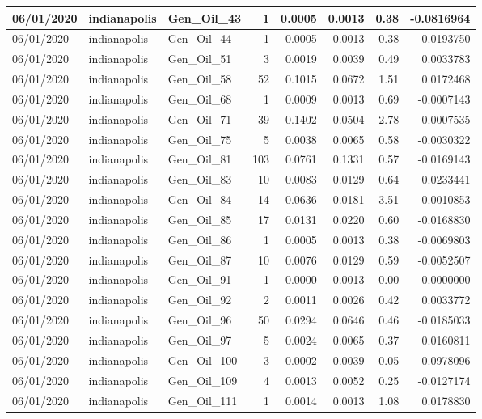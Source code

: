 \documentclass[
  letterpaper,
  DIV=11,
  numbers=noendperiod]{scrartcl}
\begin{document}
\begin{tabular}{l|l|l|r|r|r|r|r}
\hline
06/01/2020 & indianapolis & Gen\_Oil\_43 & 1 & 0.0005 & 0.0013 & 0.38 & -0.0816964\\
\hline
06/01/2020 & indianapolis & Gen\_Oil\_44 & 1 & 0.0005 & 0.0013 & 0.38 & -0.0193750\\
\hline
06/01/2020 & indianapolis & Gen\_Oil\_51 & 3 & 0.0019 & 0.0039 & 0.49 & 0.0033783\\
\hline
06/01/2020 & indianapolis & Gen\_Oil\_58 & 52 & 0.1015 & 0.0672 & 1.51 & 0.0172468\\
\hline
06/01/2020 & indianapolis & Gen\_Oil\_68 & 1 & 0.0009 & 0.0013 & 0.69 & -0.0007143\\
\hline
06/01/2020 & indianapolis & Gen\_Oil\_71 & 39 & 0.1402 & 0.0504 & 2.78 & 0.0007535\\
\hline
06/01/2020 & indianapolis & Gen\_Oil\_75 & 5 & 0.0038 & 0.0065 & 0.58 & -0.0030322\\
\hline
06/01/2020 & indianapolis & Gen\_Oil\_81 & 103 & 0.0761 & 0.1331 & 0.57 & -0.0169143\\
\hline
06/01/2020 & indianapolis & Gen\_Oil\_83 & 10 & 0.0083 & 0.0129 & 0.64 & 0.0233441\\
\hline
06/01/2020 & indianapolis & Gen\_Oil\_84 & 14 & 0.0636 & 0.0181 & 3.51 & -0.0010853\\
\hline
06/01/2020 & indianapolis & Gen\_Oil\_85 & 17 & 0.0131 & 0.0220 & 0.60 & -0.0168830\\
\hline
06/01/2020 & indianapolis & Gen\_Oil\_86 & 1 & 0.0005 & 0.0013 & 0.38 & -0.0069803\\
\hline
06/01/2020 & indianapolis & Gen\_Oil\_87 & 10 & 0.0076 & 0.0129 & 0.59 & -0.0052507\\
\hline
06/01/2020 & indianapolis & Gen\_Oil\_91 & 1 & 0.0000 & 0.0013 & 0.00 & 0.0000000\\
\hline
06/01/2020 & indianapolis & Gen\_Oil\_92 & 2 & 0.0011 & 0.0026 & 0.42 & 0.0033772\\
\hline
06/01/2020 & indianapolis & Gen\_Oil\_96 & 50 & 0.0294 & 0.0646 & 0.46 & -0.0185033\\
\hline
06/01/2020 & indianapolis & Gen\_Oil\_97 & 5 & 0.0024 & 0.0065 & 0.37 & 0.0160811\\
\hline
06/01/2020 & indianapolis & Gen\_Oil\_100 & 3 & 0.0002 & 0.0039 & 0.05 & 0.0978096\\
\hline
06/01/2020 & indianapolis & Gen\_Oil\_109 & 4 & 0.0013 & 0.0052 & 0.25 & -0.0127174\\
\hline
06/01/2020 & indianapolis & Gen\_Oil\_111 & 1 & 0.0014 & 0.0013 & 1.08 & 0.0178830\\

\end{tabular}
\end{document}
